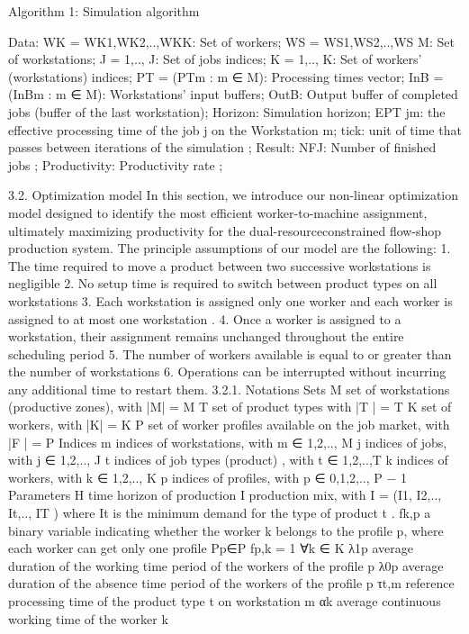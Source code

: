 Algorithm 1: Simulation algorithm
 
Data:
WK = {WK1,WK2,..,WKK}: Set of workers;
WS = {WS1,WS2,..,WS M}: Set of workstations; J = {1,.., J}: Set of jobs indices;
K = {1,.., K}: Set of workers’ (workstations) indices;
PT = (PTm : m ∈ M): Processing times vector;
InB = (InBm : m ∈ M): Workstations’ input buffers;
OutB: Output buffer of completed jobs (buffer of the last workstation);
Horizon: Simulation horizon;
EPT jm: the effective processing time of the job j on the Workstation m; tick: unit of time that passes between iterations of the simulation ;
Result:
NFJ: Number of finished jobs ;
Productivity: Productivity rate ;
 
3.2.	Optimization model
In this section, we introduce our non-linear optimization model designed to identify the most efficient worker-to-machine assignment, ultimately maximizing productivity for the dual-resourceconstrained flow-shop production system. The principle assumptions of our model are the following:
1.	The time required to move a product between two successive workstations is negligible
2.	No setup time is required to switch between product types on all workstations
3.	Each workstation is assigned only one worker and each worker is assigned to at most one workstation .
4.	Once a worker is assigned to a workstation, their assignment remains unchanged throughout the entire scheduling period
5.	The number of workers available is equal to or greater than the number of workstations
6.	Operations can be interrupted without incurring any additional time to restart them.
3.2.1.	Notations
	Sets
M	set of workstations (productive zones), with |M| = M
T	set of product types with |T | = T
K	set of workers, with |K| = K
P	set of worker profiles available on the job market, with |F | = P
	Indices
m	indices of workstations, with m ∈ {1,2,.., M}
j	indices of jobs, with j ∈ {1,2,.., J}
t	indices of job types (product) , with t ∈ {1,2,..,T}
k	indices of workers, with k ∈ {1,2,.., K}
p	indices of profiles, with p ∈ {0,1,2,.., P − 1}
	Parameters
H	time horizon of production
I	production mix, with I = (I1, I2,.., It,.., IT ) where It is the minimum demand for the type
of product t .
fk,p	a binary variable indicating whether the worker k belongs to the profile p, where each worker can get only one profile Pp∈P fp,k = 1 ∀k ∈ K
λ1p	average duration of the working time period of the workers of the profile p
λ0p	average duration of the absence time period of the workers of the profile p
τt,m	reference processing time of the product type t on workstation m
αk	average continuous working time of the worker k

